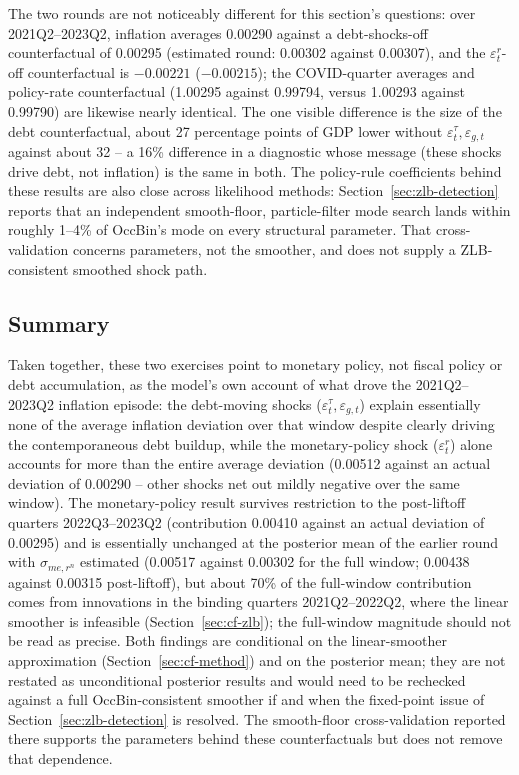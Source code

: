 \documentclass[11pt]{article}
\begin{document}
The two rounds are not noticeably different for this section's questions:
over 2021Q2--2023Q2, inflation averages 0.00290 against a debt-shocks-off
counterfactual of 0.00295 (estimated round: 0.00302 against 0.00307), and the
$\varepsilon^r_t$-off counterfactual is $-0.00221$ ($-0.00215$); the
COVID-quarter averages and policy-rate counterfactual (1.00295 against 0.99794,
versus 1.00293 against 0.99790) are likewise nearly identical. The one
visible difference is the size of the debt counterfactual, about 27 percentage
points of GDP lower without $\varepsilon^\tau_t,\varepsilon_{g,t}$ against
about 32 -- a 16\% difference in a diagnostic whose message (these shocks drive
debt, not inflation) is the same in both. The policy-rule coefficients behind
these results are also close across likelihood methods:
Section~\ref{sec:zlb-detection} reports that an independent smooth-floor,
particle-filter mode search lands within roughly 1--4\% of OccBin's mode on
every structural parameter. That cross-validation concerns parameters, not the
smoother, and does not supply a ZLB-consistent smoothed shock path.

\subsection{Summary}

Taken together, these two exercises point to monetary policy, not fiscal
policy or debt accumulation, as the model's own account of what drove the
2021Q2--2023Q2 inflation episode: the debt-moving shocks
($\varepsilon^\tau_t,\varepsilon_{g,t}$) explain essentially none of the
average inflation deviation over that window despite clearly driving the
contemporaneous debt buildup, while the monetary-policy shock
($\varepsilon^r_t$) alone accounts for more than the entire average
deviation (0.00512 against an actual deviation of 0.00290 -- other shocks
net out mildly negative over the same window). The monetary-policy result
survives restriction to the post-liftoff quarters 2022Q3--2023Q2
(contribution 0.00410 against an actual deviation of 0.00295) and is
essentially unchanged at the posterior mean of the earlier round with
$\sigma_{me,r^n}$ estimated (0.00517 against 0.00302 for the full window;
0.00438 against 0.00315 post-liftoff), but
about 70\% of the full-window contribution comes from innovations
in the binding quarters 2021Q2--2022Q2, where the linear smoother is
infeasible (Section~\ref{sec:cf-zlb}); the full-window magnitude should
not be read as precise. Both findings are conditional on the
linear-smoother approximation (Section~\ref{sec:cf-method}) and on the
posterior mean; they are not restated as unconditional posterior results
and would need to be rechecked against a full OccBin-consistent smoother
if and when the fixed-point issue of Section~\ref{sec:zlb-detection} is
resolved. The smooth-floor cross-validation reported there supports the
parameters behind these counterfactuals but does not remove that
dependence.
\end{document}
